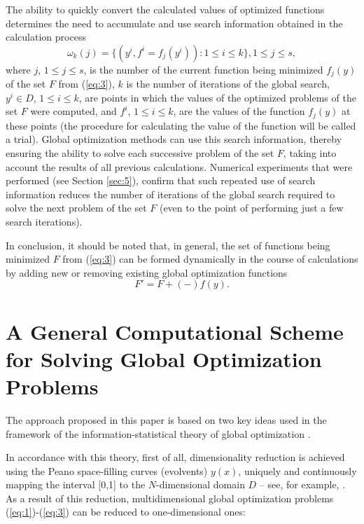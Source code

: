 \documentclass[review]{elsarticle}
\begin{document}
The ability to quickly convert the calculated values of optimized functions determines the need to accumulate and use search information obtained in the calculation process
\begin{equation}\label{eq:9}
\omega_k (j)=\{(y^i,f^i=f_j(y^i)):1 \leq i \leq k \},1 \leq j \leq s,
\end{equation}
where $j$, $1 \leq j \leq s$, is the number of the current function being minimized $f_j (y)$ of the set $F$ from (\ref{eq:3}), $k$ is the number of iterations of the global search, $y^i \in D$, $1 \leq i \leq k$,  are points in which the values of the optimized problems of the set $F$ were computed, and $f^i$, $1 \leq i \leq k$, are the values of the function $f_j (y)$ at these points (the procedure for calculating the value of the function will be called a trial). Global optimization methods can use this search information, thereby ensuring the ability to solve each successive problem of the set $F$, taking into account the results of all previous calculations. Numerical experiments that were performed (see Section \ref{sec:5}), confirm that such repeated use of search information reduces the number of iterations of the global search required to solve the next problem of the set $F$ (even to the point of performing just a few search iterations).

In conclusion, it should be noted that, in general, the set of functions being minimized $F$ from (\ref{eq:3}) can be formed dynamically in the course of calculations by adding new or removing existing global optimization functions
\begin{equation}\label{eq:10}
F'=F+(-) f(y).
\end{equation}


\section{A General Computational Scheme for Solving Global Optimization Problems}\label{sec:3}

The approach proposed in this paper is based on two key ideas used in the framework of the information-statistical theory of global optimization \cite{c6}.

In accordance with this theory, first of all, dimensionality reduction is achieved using the Peano space-filling curves (evolvents) $y(x)$, uniquely and continuously mapping the interval [0,1] to the $N$-dimensional domain $D$ -- see, for example, \cite{c6,c23}. As a result of this reduction, multidimensional global optimization problems (\ref{eq:1})-(\ref{eq:3}) can be reduced to one-dimensional ones:
\end{document}
